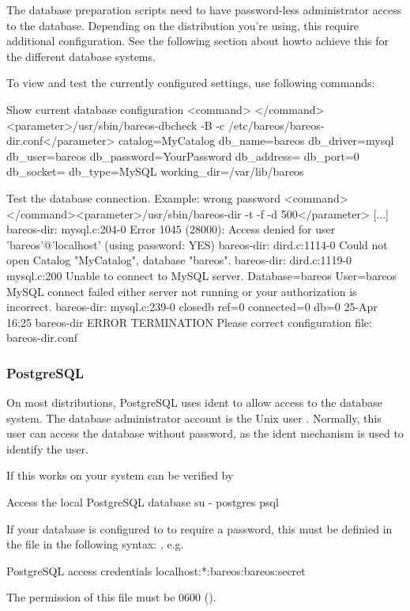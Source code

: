 The database preparation scripts need to have password-less administrator access to the database.
Depending on the distribution you're using, this require additional configuration.
See the following section about howto achieve this for the different database systems.


To view and test the currently configured settings, use following commands:
\begin{commands}{Show current database configuration}
<command> </command><parameter>/usr/sbin/bareos-dbcheck -B -c /etc/bareos/bareos-dir.conf</parameter>
catalog=MyCatalog
db_name=bareos
db_driver=mysql
db_user=bareos
db_password=YourPassword
db_address=
db_port=0
db_socket=
db_type=MySQL
working_dir=/var/lib/bareos
\end{commands}

\begin{commands}{Test the database connection. Example: wrong password}
<command> </command><parameter>/usr/sbin/bareos-dir -t -f -d 500</parameter>
[...]
bareos-dir: mysql.c:204-0 Error 1045 (28000): Access denied for user 'bareos'@'localhost' (using password: YES)
bareos-dir: dird.c:1114-0 Could not open Catalog "MyCatalog", database "bareos".
bareos-dir: dird.c:1119-0 mysql.c:200 Unable to connect to MySQL server.
Database=bareos User=bareos
MySQL connect failed either server not running or your authorization is incorrect.
bareos-dir: mysql.c:239-0 closedb ref=0 connected=0 db=0
25-Apr 16:25 bareos-dir ERROR TERMINATION
Please correct configuration file: bareos-dir.conf
\end{commands}




\subsubsection{PostgreSQL}

On most distributions, PostgreSQL uses ident to allow access to the database system.
The database administrator account is the Unix user .
Normally, this user can access the database without password, as the ident mechanism is used to identify the user.

If this works on your system can be verified by
\begin{commands}{Access the local PostgreSQL database}
su - postgres
psql
\end{commands}

If your database is configured to to require a password, this must be definied in the file
in the following syntax: , e.g.
\begin{config}{PostgreSQL access credentials}
localhost:*:bareos:bareos:secret
\end{config}
The permission of this file must be 0600 ().

